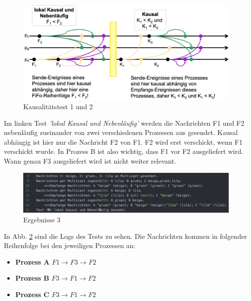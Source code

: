 \begin{figure}[htbp]
\begin{center}
\includegraphics[scale=0.25]{Latex/Bilder/Test1_2.png}
\caption{\label{test1_2} Kausalitätstest 1 und 2 \cite{Aufgabenstellung}}
\end{center}
\end{figure}

Im linken Test \textit{'lokal Kausal und Nebenläufig'} werden die Nachrichten F1 und F2 nebenläufig zueinander von zwei verschiedenen Prozessen aus gesendet. Kausal abhängig ist hier nur die Nachricht F2 von F1. F2 wird erst verschickt, wenn F1 verschickt wurde. In Prozess B ist also wichtig, dass F1 vor F2 ausgeliefert wird. Wann genau F3 ausgeliefert wird ist nicht weiter relevant.

\begin{figure}[htbp]
\begin{center}
\includegraphics[scale=0.55]{Latex/Bilder/test1_1_results.png}
\caption{\label{test1_2_result} Ergebnisse 3}
\end{center}
\end{figure}

In Abb. \ref{test1_2_result} sind die Logs des Tests zu sehen. Die Nachrichten kommen in folgender Reihenfolge bei den jeweiligen Prozessen an:

\begin{itemize}
	\item \textbf{Prozess A}  $F1 \rightarrow F3 \rightarrow F2$
	\item \textbf{Prozess B} $F3 \rightarrow F1 \rightarrow F2$
	\item \textbf{Prozess C} $F3 \rightarrow F1 \rightarrow F2$
\end{itemize}

